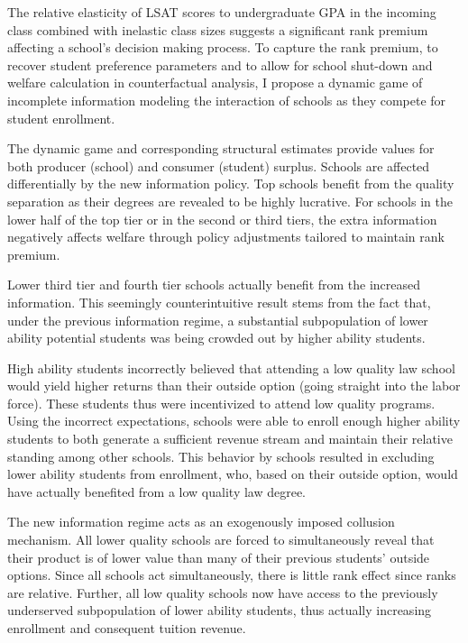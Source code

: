 \documentclass[12pt]{article}
\theoremstyle{definition}
\begin{document}
The relative elasticity of LSAT scores to undergraduate GPA in the incoming class combined with inelastic class sizes suggests a significant rank premium affecting a school's decision making process. To capture the rank premium, to recover student preference parameters and to allow for school shut-down and welfare calculation in counterfactual analysis, I propose a dynamic game of incomplete information modeling the interaction of schools as they compete for student enrollment.

The dynamic game and corresponding structural estimates provide values for both producer (school) and consumer (student) surplus. Schools are affected differentially by the new information policy. Top schools benefit from the quality separation as their degrees are revealed to be highly lucrative. For schools in the lower half of the top tier or in the second or third tiers, the extra information negatively affects welfare through policy adjustments tailored to maintain rank premium.

Lower third tier and fourth tier schools actually benefit from the increased information. This seemingly counterintuitive result stems from the fact that, under the previous information regime, a substantial subpopulation of lower ability potential students was being crowded out by higher ability students. 

High ability students incorrectly believed that attending a low quality law school would yield higher returns than their outside option (going straight into the labor force). These students thus were incentivized to attend low quality programs. Using the incorrect expectations, schools were able to enroll enough higher ability students to both generate a sufficient revenue stream and maintain their relative standing among other schools. This behavior by schools resulted in excluding lower ability students from enrollment, who, based on their outside option, would have actually benefited from a low quality law degree.

The new information regime acts as an exogenously imposed collusion mechanism. All lower quality schools are forced to simultaneously reveal that their product is of lower value than many of their previous students' outside options. Since all schools act simultaneously, there is little rank effect since ranks are relative. Further, all low quality schools now have access to the previously underserved subpopulation of lower ability students, thus actually increasing enrollment and consequent tuition revenue.
\end{document}
